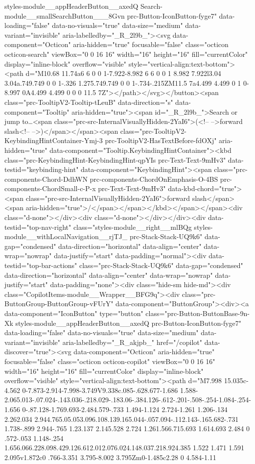 styles-module__appHeaderButton__axedQ Search-module__smallSearchButton___8Gvn prc-Button-IconButton-fyge7" data-loading="false" data-no-visuals="true" data-size="medium" data-variant="invisible" aria-labelledby="_R_2l9b_"><svg data-component="Octicon" aria-hidden="true" focusable="false" class="octicon octicon-search" viewBox="0 0 16 16" width="16" height="16" fill="currentColor" display="inline-block" overflow="visible" style="vertical-align:text-bottom"><path d="M10.68 11.74a6 6 0 0 1-7.922-8.982 6 6 0 0 1 8.982 7.922l3.04 3.04a.749.749 0 0 1-.326 1.275.749.749 0 0 1-.734-.215ZM11.5 7a4.499 4.499 0 1 0-8.997 0A4.499 4.499 0 0 0 11.5 7Z"></path></svg></button><span class="prc-TooltipV2-Tooltip-tLeuB" data-direction="s" data-component="Tooltip" aria-hidden="true"><span id="_R_2l9b_">Search or jump to…<span class="prc-src-InternalVisuallyHidden-2YaI6">(<!-- -->forward slash<!-- -->)</span></span><span class="prc-TooltipV2-KeybindingHintContainer-Ymj-3 prc-TooltipV2-HasTextBefore-fdOXj" aria-hidden="true" data-component="Tooltip.KeybindingHintContainer"><kbd class="prc-KeybindingHint-KeybindingHint-qpYIs prc-Text-Text-9mHv3" data-testid="keybinding-hint" data-component="KeybindingHint"><span class="prc-components-Chord-DdhWN prc-components-ChordOnEmphasis-O-4BS prc-components-ChordSmall-c-P-x prc-Text-Text-9mHv3" data-kbd-chord="true"> <span class="prc-src-InternalVisuallyHidden-2YaI6">forward slash</span><span aria-hidden="true">/</span></span></kbd></span></span><div class="d-none"></div><div class="d-none"></div></div><div data-testid="top-nav-right" class="styles-module__right__mlBQg styles-module__withLocalNavigation__rjTJ_ prc-Stack-Stack-UQ9k6" data-gap="condensed" data-direction="horizontal" data-align="center" data-wrap="nowrap" data-justify="start" data-padding="normal"><div data-testid="top-bar-actions" class="prc-Stack-Stack-UQ9k6" data-gap="condensed" data-direction="horizontal" data-align="center" data-wrap="nowrap" data-justify="start" data-padding="none"><div class="hide-sm hide-md"><div class="CopilotItems-module__Wrapper__BFG9q"><div class="prc-ButtonGroup-ButtonGroup-vFUrY" data-component="ButtonGroup"><div><a data-component="IconButton" type="button" class="prc-Button-ButtonBase-9n-Xk styles-module__appHeaderButton__axedQ prc-Button-IconButton-fyge7" data-loading="false" data-no-visuals="true" data-size="medium" data-variant="invisible" aria-labelledby="_R_akjpb_" href="/copilot" data-discover="true"><svg data-component="Octicon" aria-hidden="true" focusable="false" class="octicon octicon-copilot" viewBox="0 0 16 16" width="16" height="16" fill="currentColor" display="inline-block" overflow="visible" style="vertical-align:text-bottom"><path d="M7.998 15.035c-4.562 0-7.873-2.914-7.998-3.749V9.338c.085-.628.677-1.686 1.588-2.065.013-.07.024-.143.036-.218.029-.183.06-.384.126-.612-.201-.508-.254-1.084-.254-1.656 0-.87.128-1.769.693-2.484.579-.733 1.494-1.124 2.724-1.261 1.206-.134 2.262.034 2.944.765.05.053.096.108.139.165.044-.057.094-.112.143-.165.682-.731 1.738-.899 2.944-.765 1.23.137 2.145.528 2.724 1.261.566.715.693 1.614.693 2.484 0 .572-.053 1.148-.254 1.656.066.228.098.429.126.612.012.076.024.148.037.218.924.385 1.522 1.471 1.591 2.095v1.872c0 .766-3.351 3.795-8.002 3.795Zm0-1.485c2.28 0 4.584-1.11 